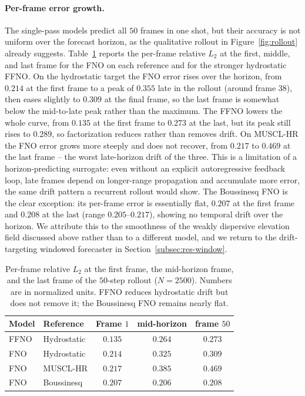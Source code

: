 \paragraph{Per-frame error growth.}
The single-pass models predict all $50$ frames in one shot, but their accuracy is not uniform over the forecast horizon, as the qualitative rollout in Figure~\ref{fig:rollout} already suggests. Table~\ref{tab:perframe} reports the per-frame relative $L_2$ at the first, middle, and last frame for the FNO on each reference and for the stronger hydrostatic FFNO. On the hydrostatic target the FNO error rises over the horizon, from $0.214$ at the first frame to a peak of $0.355$ late in the rollout (around frame $38$), then eases slightly to $0.309$ at the final frame, so the last frame is somewhat below the mid-to-late peak rather than the maximum. The FFNO lowers the whole curve, from $0.135$ at the first frame to $0.273$ at the last, but its peak still rises to $0.289$, so factorization reduces rather than removes drift. On MUSCL-HR the FNO error grows more steeply and does not recover, from $0.217$ to $0.469$ at the last frame -- the worst late-horizon drift of the three. This is a limitation of a horizon-predicting surrogate: even without an explicit autoregressive feedback loop, late frames depend on longer-range propagation and accumulate more error, the same drift pattern a recurrent rollout would show. The Boussinesq FNO is the clear exception: its per-frame error is essentially flat, $0.207$ at the first frame and $0.208$ at the last (range $0.205$--$0.217$), showing no temporal drift over the horizon. We attribute this to the smoothness of the weakly dispersive elevation field discussed above rather than to a different model, and we return to the drift-targeting windowed forecaster in Section~\ref{subsec:res-window}.

\begin{table}[!htbp]
\centering
\caption{Per-frame relative $L_2$ at the first frame, the mid-horizon frame, and the last frame of the $50$-step rollout ($N = 2500$). Numbers are in normalized units. FFNO reduces hydrostatic drift but does not remove it; the Boussinesq FNO remains nearly flat.}
\label{tab:perframe}
\begin{tabular}{llccc}
    \toprule
    Model & Reference & Frame $1$ & mid-horizon & frame $50$ \\
    \midrule
    FFNO & Hydrostatic & $0.135$ & $0.264$ & $0.273$ \\
    FNO  & Hydrostatic & $0.214$ & $0.325$ & $0.309$ \\
    FNO  & MUSCL-HR    & $0.217$ & $0.385$ & $0.469$ \\
    FNO  & Boussinesq  & $0.207$ & $0.206$ & $0.208$ \\
    \bottomrule
\end{tabular}
\end{table}

